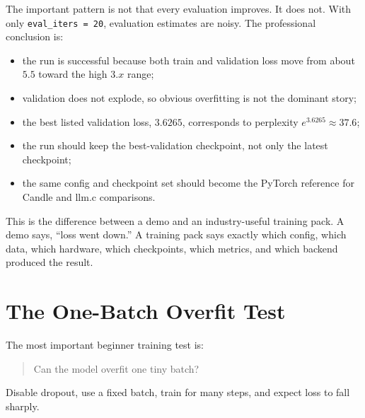 The important pattern is not that every evaluation improves. It does not. With only
\texttt{eval\_iters = 20}, evaluation estimates are noisy. The professional conclusion is:

\begin{itemize}
  \item the run is successful because both train and validation loss move from about
  \(5.5\) toward the high \(3.x\) range;
  \item validation does not explode, so obvious overfitting is not the dominant story;
  \item the best listed validation loss, \(3.6265\), corresponds to perplexity
  \(e^{3.6265}\approx37.6\);
  \item the run should keep the best-validation checkpoint, not only the latest
  checkpoint;
  \item the same config and checkpoint set should become the PyTorch reference for
  Candle and llm.c comparisons.
\end{itemize}

This is the difference between a demo and an industry-useful training pack. A demo says,
``loss went down.'' A training pack says exactly which config, which data, which hardware,
which checkpoints, which metrics, and which backend produced the result.

\section{The One-Batch Overfit Test}

The most important beginner training test is:

\begin{quote}
Can the model overfit one tiny batch?
\end{quote}

Disable dropout, use a fixed batch, train for many steps, and expect loss to fall sharply.

\begin{center}
\end{center}

